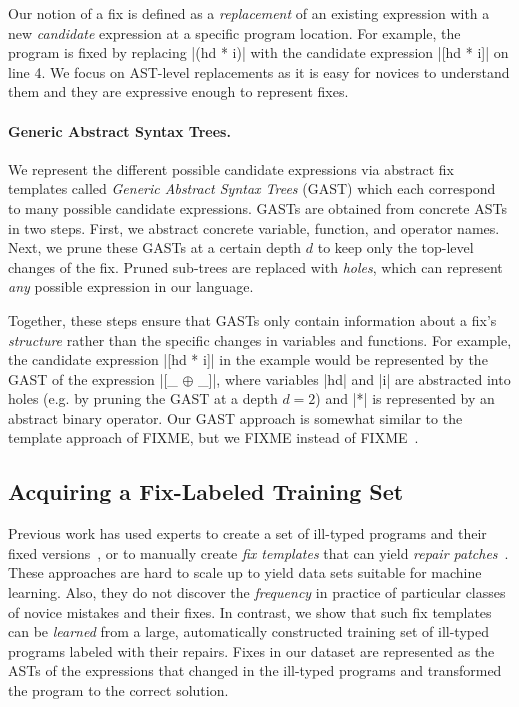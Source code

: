 Our notion of a fix is defined as a \emph{replacement} of an existing expression
with a new \emph{candidate} expression at a specific program location. For
example, the \mbd program is fixed by replacing |(hd * i)| with the candidate
expression |[hd * i]| on line 4. We focus on AST-level replacements as it is
easy for novices to understand them and they are expressive enough to represent fixes.


\paragraph{Generic Abstract Syntax Trees.}
%
We represent the different possible candidate expressions via abstract fix
templates called \emph{Generic Abstract Syntax Trees} (GAST) which each correspond to
many possible candidate expressions.
%
GASTs are obtained from concrete ASTs in two steps.
%
First, we abstract concrete variable, function, and operator names.
%
Next, we prune these GASTs at a certain depth $d$ to keep only the top-level
changes of the fix. Pruned sub-trees are replaced with \emph{holes}, which can
represent \emph{any} possible expression in our language.


Together, these steps ensure that GASTs only contain information about a fix's
\emph{structure} rather than the specific changes in variables and functions.
%
For example, the candidate expression |[hd * i]| in the \mbd example would be
represented by the GAST of the expression |[_ $\oplus$ _]|, where variables |hd|
and |i| are abstracted into holes (e.g. by pruning the GAST at a depth $d=2$)
and |*| is represented by an abstract binary operator. Our GAST approach
is somewhat similar to the template approach of FIXME, but we FIXME instead
of FIXME~\cite{FIXME}.


\subsection{Acquiring a Fix-Labeled Training Set}
\label{sec:overview:data}

Previous work has used experts to create a set of ill-typed programs and their
fixed versions~\citep[][]{Lerner2007-dt, Loncaric2016-uk}, or to manually create
\emph{fix templates} that can yield \emph{repair
patches}~\citep[][]{martinez2013automatically,martinez2015mining}.
%
These approaches are hard to scale up to yield data sets suitable for machine
learning. Also, they do not discover the \emph{frequency} in practice of particular
classes of novice mistakes and their fixes.
%
In contrast, we show that such fix templates can be \emph{learned} from a large,
automatically constructed training set of ill-typed programs labeled with their
repairs.
%
Fixes in our dataset are represented as the ASTs of the expressions that changed
in the ill-typed programs and transformed the program to the correct solution.


